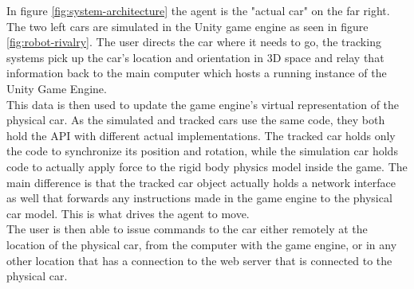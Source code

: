 \documentclass[10pt,a4paper]{article}
\begin{document}
	In figure \ref{fig:system-architecture} the agent is the "actual car" on the far right. The two left cars are simulated in the Unity game engine as seen in figure \ref{fig:robot-rivalry}. The user directs the car where it needs to go, the tracking systems pick up the car's location and orientation in 3D space and relay that information back to the main computer which hosts a running instance of the Unity Game Engine.
	\\
	This data is then used to update the game engine's virtual representation of the physical car. As the simulated and tracked cars use the same code, they both hold the API with different actual implementations. The tracked car holds only the code to synchronize its position and rotation, while the simulation car holds code to actually apply force to the rigid body physics model inside the game. The main difference is that the tracked car object actually holds a network interface as well that forwards any instructions made in the game engine to the physical car model. This is what drives the agent to move.
	\\
	The user is then able to issue commands to the car either remotely at the location of the physical car, from the computer with the game engine, or in any other location that has a connection to the web server that is connected to the physical car.
\end{document}
